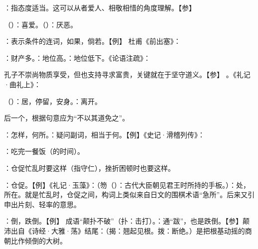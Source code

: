 {
\item {}：指态度适当。这可以从者爱人、相敬相惜的角度理解。【参】 
\item {}（）：喜爱。（）：厌恶。
}
{}


{
\item {}：表示条件的连词，如果，倘若。【例】 杜甫《前出塞》：
}
{}


{
\item {}：财产多。：地位高。：地位低下。《论语注疏》：

孔子不崇尚物质享受，但也支持寻求富贵，关键就在于坚守道义。【参】  。《礼记·曲礼上》：
\item {}（）：居，停留，安身。：离开。
\item 后一个，根据句意应为“不以其道免之”。
\item {}：怎样，何所。：疑问副词，相当于何。【例】《史记·滑稽列传》：
\item {}：吃完一餐饭（的时间）。
\item {}：仓促忙乱时要这样（指守仁），挫折困顿时也要这样。

：仓促。【例】《礼记·玉藻》：（笏（）：古代大臣朝见君王时所持的手板。）：处，所在。就是忙乱时，仓促之间，构词上类似来自日文的围棋术语“急所”。后来又引申出片刻、轻率的意思。

：倒，跌倒。【例】 成语“颠扑不破”（扑：击打）。：通“跋”，也是跌倒。【参】颠沛出自《诗经·大雅·荡》结尾：（揭：翘起见根。拨：断绝。）是把根基动摇的商朝比作倾倒的大树。
}  %
{}


